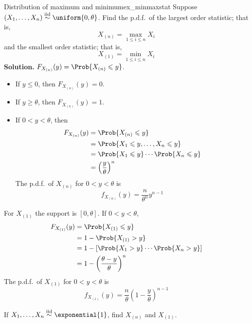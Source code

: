 \begin{Example}{Distribution of maximum and minimum}{ex_minmaxstat}
    Suppose $ (X_1,\ldots,X_n)\stackrel{\text{iid}}{\sim}\uniform{0,\theta} $.
    Find the p.d.f.\ of the largest order statistic; that is,
    \[ X_{(n)}=\max_{1\leqslant i\leqslant n} X_i \]
    and the smallest order statistic; that is,
    \[ X_{(1)}=\min_{1\leqslant i\leqslant n}X_i \]
    \textbf{Solution.} $ F_{X_{(n)}}(y)=\Prob{X_{(n)}\leqslant y} $.
    \begin{itemize}
        \item If $ y\leqslant 0 $, then $ F_{X_{(n)}}(y)=0 $.
        \item If $ y\geqslant \theta $, then $ F_{X_{(n)}}(y)=1 $.
        \item If $ 0<y<\theta $, then
              \begin{align*}
                  F_{X_{(n)}}(y)
                   & =\Prob{X_{(n)}\leqslant y}                        \\
                   & =\Prob{X_1\leqslant y,\ldots,X_n\leqslant y}      \\
                   & =\Prob{X_1\leqslant y}\cdots\Prob{X_n\leqslant y} \\
                   & =\left( \frac{y}{\theta} \right)^n
              \end{align*}
              The p.d.f.\ of $ X_{(n)} $ for $ 0<y<\theta $ is
              \[ f_{X_{(n)}}(y)=\frac{n}{\theta^n}y^{n-1} \]
    \end{itemize}
    For $ X_{(1)} $ the support is $ [0,\theta] $. If $ 0<y<\theta $,
    \begin{align*}
        F_{X_{(1)}}(y)
         & =\Prob{X_{(1)}\leqslant y}                        \\
         & =1-\Prob{X_{(1)}>y}                               \\
         & =1-\left[ \Prob{X_1>y}\cdots \Prob{X_n>y} \right] \\
         & =1-\left( \frac{\theta-y}{\theta}  \right)^n
    \end{align*}
    The p.d.f.\ of $ X_{(1)} $ for $ 0<y<\theta $ is
    \[ f_{X_{(1)}}(y)=\frac{n}{\theta} \left( 1-\frac{y}{\theta}  \right)^{n-1} \]
\end{Example}
\begin{Exercise}{}{}
    If $ X_1,\ldots,X_n \stackrel{\text{iid}}{\sim} \exponential{1} $,
    find $ X_{(n)} $ and $ X_{(1)} $.
\end{Exercise}
